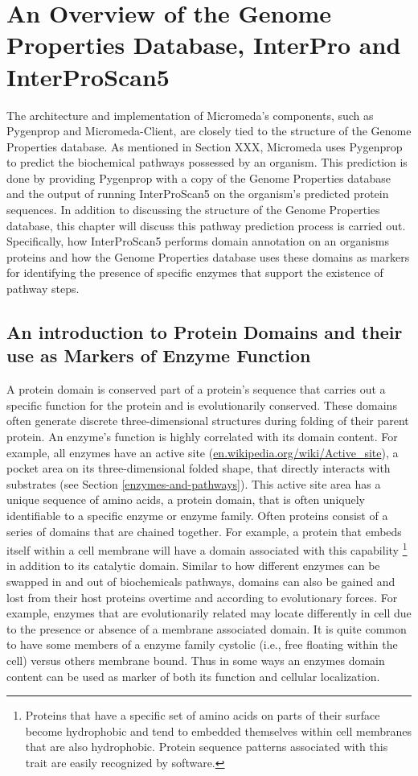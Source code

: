 \chapter{An Overview of the Genome Properties Database, InterPro and InterProScan5} \label{genome-properties} 

The architecture and implementation of Micromeda's components, such as Pygenprop and Micromeda-Client, are closely tied to the structure of the Genome Properties database. As mentioned in Section XXX, Micromeda uses Pygenprop to predict the biochemical pathways possessed by an organism. This prediction is done by providing Pygenprop with a copy of the Genome Properties database and the output of running InterProScan5 on the organism's predicted protein sequences. In addition to discussing the structure of the Genome Properties database, this chapter will discuss this pathway prediction process is carried out. Specifically, how InterProScan5 performs domain annotation on an organisms proteins and how the Genome Properties database uses these domains as markers for identifying the presence of specific enzymes that support the existence of pathway steps.

\section{An introduction to Protein Domains and their use as Markers of Enzyme Function}

A protein domain is conserved part of a protein's sequence that carries out a specific function for the protein and is evolutionarily conserved. These domains often generate discrete three-dimensional structures during folding of their parent protein. An enzyme's function is highly correlated with its domain content. For example, all enzymes have an active site (\href{en.wikipedia.org/wiki/Active\_site}{en.wikipedia.org/wiki/Active\_site}), a pocket area on its three-dimensional folded shape, that directly interacts with substrates (see Section \ref{enzymes-and-pathways}). This active site area has a unique sequence of amino acids, a protein domain, that is often uniquely identifiable to a specific enzyme or enzyme family. Often proteins consist of a series of domains that are chained together. For example, a protein that embeds itself within a cell membrane will have a domain associated with this capability \footnote{Proteins that have a specific set of amino acids on parts of their surface become hydrophobic and tend to embedded themselves within cell membranes that are also hydrophobic. Protein sequence patterns associated with this trait are easily recognized by software.} in addition to its catalytic domain. Similar to how different enzymes can be swapped in and out of biochemicals pathways, domains can also be gained and lost from their host proteins overtime and according to evolutionary forces. For example, enzymes that are evolutionarily related may locate differently in cell due to the presence or absence of a membrane associated domain. It is quite common to have some members of a enzyme family cystolic (i.e., free floating within the cell) versus others membrane bound. Thus in some ways an enzymes domain content can be used as marker of both its function and cellular localization.

